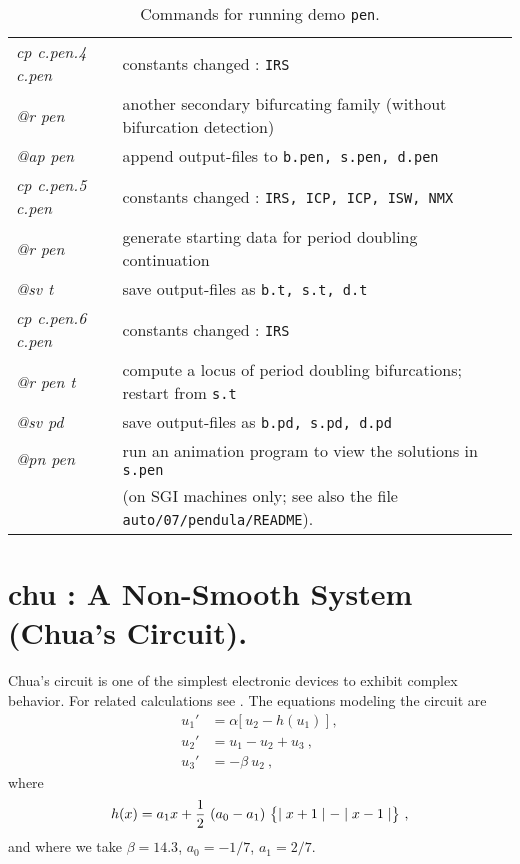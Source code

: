 \documentclass[12pt]{report}
\def\abs#1{\mid#1\mid}
\begin{document}
\begin{table}[htbp]
\begin{center}
\begin{tabular}{| l | l |}
\hline
  {\it cp c.pen.4 c.pen} & constants changed : {\tt IRS} \\ 
  {\it @r pen} &  another secondary bifurcating family (without bifurcation detection) \\ 
  {\it @ap pen} & append output-files to {\tt b.pen, s.pen, d.pen} \\ 
\hline
  {\it cp c.pen.5 c.pen} & constants changed : {\tt IRS, ICP, ICP, ISW, NMX} \\ 
  {\it @r pen} &  generate starting data for period doubling continuation \\ 
  {\it @sv t} & save output-files as {\tt b.t, s.t, d.t} \\ 
\hline
  {\it cp c.pen.6 c.pen} & constants changed : {\tt IRS} \\ 
  {\it @r pen t} &  compute a locus of period doubling bifurcations; restart from {\tt s.t} \\ 
  {\it @sv pd} & save output-files as {\tt b.pd, s.pd, d.pd} \\ 
\hline
  {\it @pn pen} & run an animation program to view the solutions in {\tt s.pen} \\ 
  & (on SGI machines only; see also the file {\tt auto/07/pendula/README}).
  \\ 
\hline
\end{tabular}
\caption{Commands for running demo {\tt pen}.}
\label{tbl:demo_pen}
\end{center}
\end{table}

\newpage
\section{ chu :  A Non-Smooth System (Chua's Circuit).} \label{sec:Demos_chu}
Chua's circuit 
is one of the simplest electronic devices to exhibit complex behavior. 
For related calculations see
 \citeyear{KhRoCh:93}.
The equations modeling the circuit are
\begin{equation} \begin{array}{cl}
 u_1' &=  \alpha \bigl[~ u_2 - h(u_1) ~\bigr]~,\\ 
 u_2' &=  u_1 - u_2 + u_3~, \\  
 u_3' &=  - \beta~ u_2~,  
\end{array} \end{equation}
where
$$ h(x) = a_1 x + {1 \over 2}~ (a_0 - a_1) ~
  \bigl\{ \abs{x+1} -  \abs{x-1} \bigr\}~,$$
and where we take
$\beta = 14.3$, $a_0 = - 1/7$, $a_1 = 2/7$.
\end{document}
